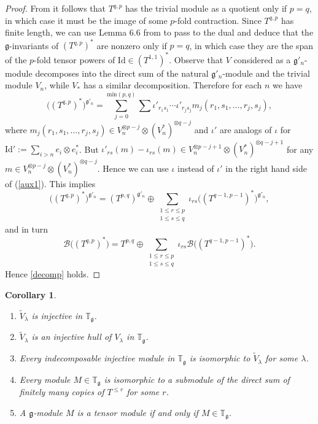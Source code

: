 \documentclass{amsart}
\newcommand{\Tg}{\mathbb T_{\mathfrak g}}
\renewcommand{\gg}{\mathfrak{g}}
\newtheorem{cor}[thm]{Corollary}
\theoremstyle{definition}
\numberwithin{equation}{section}
\begin{document}
\begin{proof}
From \cite{PStyr} it follows that $T^{q,p}$ has the trivial module as a quotient only if $p = q$, in which case it must be the image of some $p$-fold contraction.  Since $T^{q,p}$ has finite length, we can use Lemma 6.6 from \cite{PS} to pass to the dual and deduce that the $\gg$-invariants of $(T^{q,p})^*$ are nonzero only if $p = q$, in which case they are the span of the $p$-fold tensor powers of $\mathrm{Id} \in (T^{1,1})^*$.  Observe that $V$ considered as a $\gg'_n$-module decomposes into the direct sum of the natural $\gg'_n$-module and the trivial module $V_n$, while $V_*$ has a similar decomposition.  Therefore for each $n$ we have 
\begin{equation}\label{aux1}
\big((T^{q,p})^*\big)^{\gg'_n}=\sum_{j=0}^{\mathrm{min}(p,q)}\sum\iota'_{r_1s_1}\cdots\iota'_{r_js_j}m_j(r_1,s_1,\dots,r_j,s_j),
\end{equation}
where 
$m_j(r_1,s_1,\dots,r_j,s_j)\in V_n^{\otimes p-j}\otimes
(V_n^*)^{\otimes q-j}$ and $\iota'$ are analogs of $\iota$ for
$\mathrm{Id}' := \sum_{i >n} e_i \otimes e_i^*$. But $\iota'_{rs}(m)-\iota_{rs}(m)\in  V_n^{\otimes p-j+1}\otimes
(V_n^*)^{\otimes q-j+1}$ for any
$m \in  V_n^{\otimes p-j}\otimes (V_n^*)^{\otimes q-j}$. Hence we can use $\iota$ instead of
$\iota'$ in the right hand side of (\ref{aux1}). This implies
$$\big((T^{q,p})^*\big)^{\gg'_n}=(T^{p,q})^{\gg'_n}\oplus \sum_{\substack{1\leq r \leq p \\ 1 \leq s \leq q}} \iota_{rs}\big((T^{q-1,p-1})^*\big)^{\gg'_n},$$
and in turn
$$\mathcal B \big((T^{q,p})^*\big)=T^{p,q}\oplus \sum_{\substack{1\leq    r \leq p \\ 1 \leq s \leq q}} \iota_{rs}\mathcal B\big((T^{q-1,p-1})^*\big).$$ 
Hence \eqref{decomp} holds.
\end{proof}

\begin{cor}\label{newlab}
\begin{enumerate}
\item $\tilde V_\lambda$ is injective in $\Tg$.
\item $\tilde V_\lambda$ is an injective hull of $V_\lambda$ in $\Tg$.
\item Every indecomposable injective module in $\Tg$ is isomorphic to $\tilde V_\lambda$ for some $\lambda$.
\item \label{cor4} Every module $M \in \Tg$ is isomorphic to a submodule of the direct sum of finitely many copies of $T^{\leq r}$ for some $r$.
\item A $\gg$-module $M$ is a tensor module if and only if $M \in \Tg$.
\end{enumerate}
\end{cor}
\end{document}
